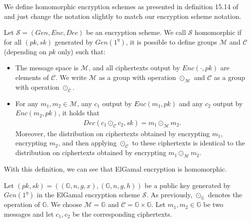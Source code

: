 We define homomorphic encryption schemes as presented in definition 15.14 of \cite{katz_introduction_2021} and just change the notation slightly to match our encryption scheme notation.

\begin{definition}
    Let $\mathcal{S}=(Gen, Enc, Dec)$ be an encryption scheme. We call $\mathcal{S}$ homomorphic if for all $(pk, sk)$ generated by $Gen(1^\eta)$, it is possible to define groups $\mathcal{M}$ and $\mathcal{C}$ (depending on $pk$ only) such that:
    \begin{itemize}
        \item The message space is $\mathcal{M}$, and all ciphertexts output by $Enc(\cdot, pk)$ are elements of $\mathcal{C}$. 
        We write $\mathcal{M}$ as a group with operation $\odot_{\mathcal{M}}$ and $\mathcal{C}$ as a group with operation $\odot_{\mathcal{C}}$.
        \item For any $m_1, m_2\in \mathcal{M}$, any $c_1$ output by $Enc(m_1, pk)$ and any $c_2$ output by $Enc(m_2, pk)$, it holds that \begin{align*}
            Dec(c_1\odot_{\mathcal{C}} c_2, sk) = m_1 \odot_{\mathcal{M}} m_2 \text{.}
        \end{align*}
        Moreover, the distribution on ciphertexts obtained by encrypting $m_1$, encrypting $m_2$, and then applying $\odot_{\mathcal{C}}$ to these ciphertexts is identical to the distribution on ciphertexts obtained by encrypting $m_1\odot_{\mathcal{M}}m_2$.
    \end{itemize}
\end{definition}

With this definition, we can see that ElGamal encryption is homomorphic.

Let $(pk, sk)=((\mathbb{G}, n, g, x), (\mathbb{G}, n, g, h))$ be a public key generated by $Gen(1^\eta)$ in the ElGamal encryption scheme $\mathcal{S}$. 
As previously, $\odot_{\mathbb{G}}$ denotes the operation of $\mathbb{G}$.
We choose $\mathcal{M}=\mathbb{G}$ and $\mathcal{C}=\mathbb{G}\times \mathbb{G}$.
Let $m_1, m_2\in\mathbb{G}$ be two messages and let $c_1, c_2$ be the corresponding ciphertexts.

